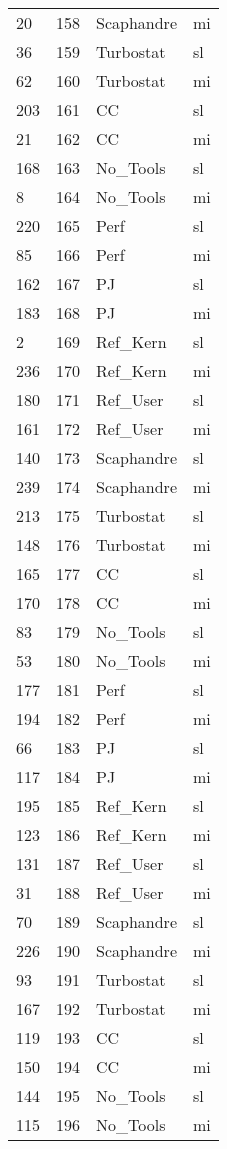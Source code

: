 \begin{tabular}{lrll}
20 & 158 & Scaphandre & mi \\
36 & 159 & Turbostat & sl \\
62 & 160 & Turbostat & mi \\
203 & 161 & CC & sl \\
21 & 162 & CC & mi \\
168 & 163 & No_Tools & sl \\
8 & 164 & No_Tools & mi \\
220 & 165 & Perf & sl \\
85 & 166 & Perf & mi \\
162 & 167 & PJ & sl \\
183 & 168 & PJ & mi \\
2 & 169 & Ref_Kern & sl \\
236 & 170 & Ref_Kern & mi \\
180 & 171 & Ref_User & sl \\
161 & 172 & Ref_User & mi \\
140 & 173 & Scaphandre & sl \\
239 & 174 & Scaphandre & mi \\
213 & 175 & Turbostat & sl \\
148 & 176 & Turbostat & mi \\
165 & 177 & CC & sl \\
170 & 178 & CC & mi \\
83 & 179 & No_Tools & sl \\
53 & 180 & No_Tools & mi \\
177 & 181 & Perf & sl \\
194 & 182 & Perf & mi \\
66 & 183 & PJ & sl \\
117 & 184 & PJ & mi \\
195 & 185 & Ref_Kern & sl \\
123 & 186 & Ref_Kern & mi \\
131 & 187 & Ref_User & sl \\
31 & 188 & Ref_User & mi \\
70 & 189 & Scaphandre & sl \\
226 & 190 & Scaphandre & mi \\
93 & 191 & Turbostat & sl \\
167 & 192 & Turbostat & mi \\
119 & 193 & CC & sl \\
150 & 194 & CC & mi \\
144 & 195 & No_Tools & sl \\
115 & 196 & No_Tools & mi \\

\end{tabular}
